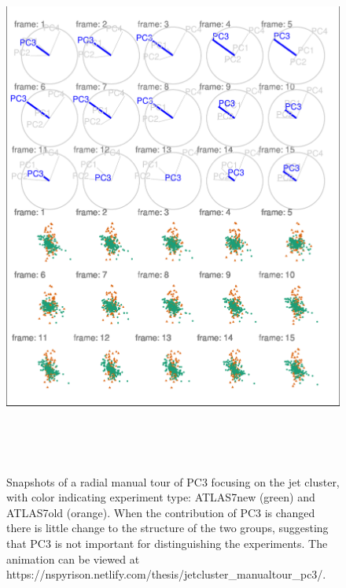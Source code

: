 \begin{Schunk}
\begin{figure}

{\centering \includegraphics[width=5.83in,height=7in]{spinifex_paper_files/figure-latex/JetClusterBad-1} 

}

\caption[Snapshots of a radial manual tour of PC3 focusing on the jet cluster, with color indicating experiment type]{Snapshots of a radial manual tour of PC3 focusing on the jet cluster, with color indicating experiment type: ATLAS7new (green) and ATLAS7old (orange).  When the contribution of PC3 is changed there is little change to the structure of the two groups, suggesting that PC3 is not important for distinguishing the experiments. The animation can be viewed at https://nspyrison.netlify.com/thesis/jetcluster\_manualtour\_pc3/.}\label{fig:JetClusterBad}
\end{figure}
\end{Schunk}

